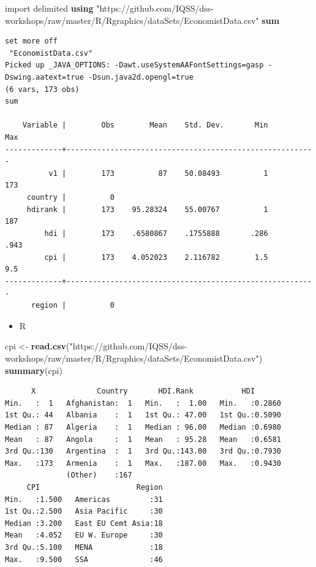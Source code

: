 \documentclass[
]{book}
\newenvironment{Shaded}{\begin{snugshade}}{\end{snugshade}}
\newcommand{\KeywordTok}[1]{\textcolor[rgb]{0.13,0.29,0.53}{\textbf{#1}}}
\newcommand{\NormalTok}[1]{#1}
\newcommand{\StringTok}[1]{\textcolor[rgb]{0.31,0.60,0.02}{#1}}
\providecommand{\tightlist}{%
  \setlength{\itemsep}{0pt}\setlength{\parskip}{0pt}}
\begin{document}
\begin{Shaded}
\begin{Highlighting}[]
\NormalTok{import delimited }\KeywordTok{using} \StringTok{"https://github.com/IQSS/dss-workshops/raw/master/R/Rgraphics/dataSets/EconomistData.csv"}
\KeywordTok{sum}
\end{Highlighting}
\end{Shaded}

\begin{verbatim}
set more off
 "EconomistData.csv"
Picked up _JAVA_OPTIONS: -Dawt.useSystemAAFontSettings=gasp -Dswing.aatext=true -Dsun.java2d.opengl=true
(6 vars, 173 obs)
sum

    Variable |        Obs        Mean    Std. Dev.       Min        Max
-------------+---------------------------------------------------------
          v1 |        173          87    50.08493          1        173
     country |          0
     hdirank |        173    95.28324    55.00767          1        187
         hdi |        173    .6580867    .1755888       .286       .943
         cpi |        173    4.052023    2.116782        1.5        9.5
-------------+---------------------------------------------------------
      region |          0
\end{verbatim}

\begin{itemize}
\tightlist
\item
  R
\end{itemize}

\begin{Shaded}
\begin{Highlighting}[]
\NormalTok{cpi <-}\StringTok{ }\KeywordTok{read.csv}\NormalTok{(}\StringTok{"https://github.com/IQSS/dss-workshops/raw/master/R/Rgraphics/dataSets/EconomistData.csv"}\NormalTok{)}
\KeywordTok{summary}\NormalTok{(cpi)}
\end{Highlighting}
\end{Shaded}

\begin{verbatim}
      X              Country       HDI.Rank           HDI        
Min.   :  1   Afghanistan:  1   Min.   :  1.00   Min.   :0.2860  
1st Qu.: 44   Albania    :  1   1st Qu.: 47.00   1st Qu.:0.5090  
Median : 87   Algeria    :  1   Median : 96.00   Median :0.6980  
Mean   : 87   Angola     :  1   Mean   : 95.28   Mean   :0.6581  
3rd Qu.:130   Argentina  :  1   3rd Qu.:143.00   3rd Qu.:0.7930  
Max.   :173   Armenia    :  1   Max.   :187.00   Max.   :0.9430  
              (Other)    :167                                    
     CPI                      Region  
Min.   :1.500   Americas         :31  
1st Qu.:2.500   Asia Pacific     :30  
Median :3.200   East EU Cemt Asia:18  
Mean   :4.052   EU W. Europe     :30  
3rd Qu.:5.100   MENA             :18  
Max.   :9.500   SSA              :46
\end{verbatim}
\end{document}
